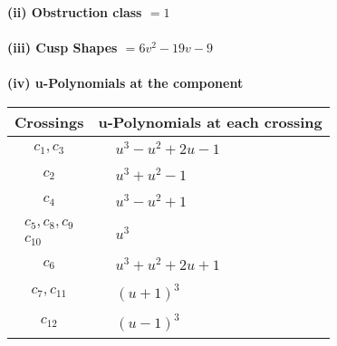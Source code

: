 \documentclass[1p]{elsarticle_modified}
\theoremstyle{definition}
\begin{document}
\flushleft \textbf{(ii) Obstruction class $= 1$}\\~\\
\flushleft \textbf{(iii) Cusp Shapes $= 6 v^2-19 v-9$}\\~\\
\newpage\renewcommand{\arraystretch}{1}
\flushleft \textbf{(iv) u-Polynomials at the component}\newline \\
\begin{tabular}{m{50pt}|m{274pt}}
Crossings & \hspace{64pt}u-Polynomials at each crossing \\
\hline $$\begin{aligned}c_{1},c_{3}\end{aligned}$$&$\begin{aligned}
&u^3- u^2+2 u-1
\end{aligned}$\\
\hline $$\begin{aligned}c_{2}\end{aligned}$$&$\begin{aligned}
&u^3+u^2-1
\end{aligned}$\\
\hline $$\begin{aligned}c_{4}\end{aligned}$$&$\begin{aligned}
&u^3- u^2+1
\end{aligned}$\\
\hline $$\begin{aligned}c_{5},c_{8},c_{9}\\c_{10}\end{aligned}$$&$\begin{aligned}
&u^3
\end{aligned}$\\
\hline $$\begin{aligned}c_{6}\end{aligned}$$&$\begin{aligned}
&u^3+u^2+2 u+1
\end{aligned}$\\
\hline $$\begin{aligned}c_{7},c_{11}\end{aligned}$$&$\begin{aligned}
&(u+1)^3
\end{aligned}$\\
\hline $$\begin{aligned}c_{12}\end{aligned}$$&$\begin{aligned}
&(u-1)^3
\end{aligned}$\\
\hline
\end{tabular}\\~\\
\end{document}
